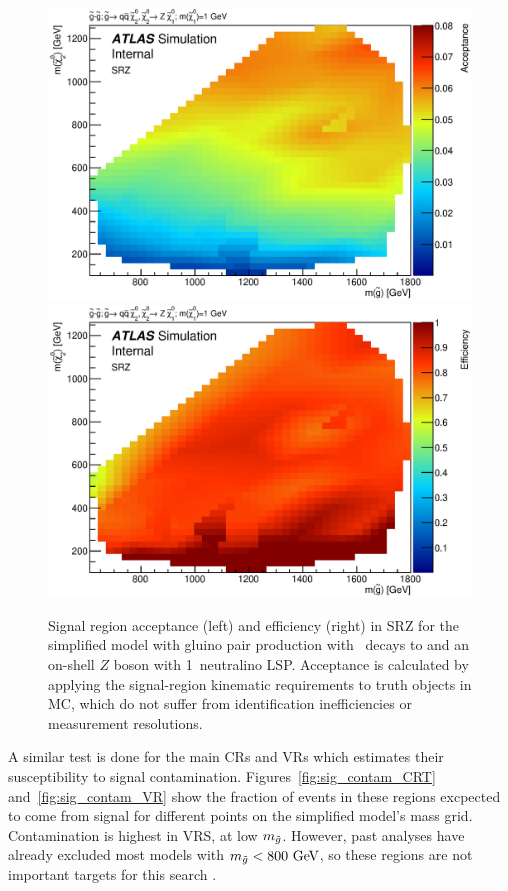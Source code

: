 \begin{figure}[ht]
\centering
\includegraphics[width=.48\textwidth]{figures/signalacceptcontam/acc_SM_GG_N2_1.eps}
\includegraphics[width=.48\textwidth]{figures/signalacceptcontam/eff_SM_GG_N2_1.eps}
\caption{
Signal region acceptance (left) and efficiency (right) in SRZ for the simplified model with gluino pair production with \chitwozero\ decays to \chionezero and an on-shell $Z$ boson with 1\gev~neutralino LSP.  
Acceptance is calculated by applying the signal-region kinematic requirements to truth objects in \ac{MC}, which do not suffer from identification inefficiencies or measurement resolutions.
}
\label{fig:acc_SMGGN2_1_z}
\end{figure}

A similar test is done for the main \acp{CR} and \acp{VR} which estimates their susceptibility to signal contamination. Figures~\ref{fig:sig_contam_CRT} and~\ref{fig:sig_contam_VR} show the fraction of events in these regions excpected to come from signal for different points on the simplified model's mass grid. Contamination is highest in VRS, at low $m_{\tilde g}$. However, past analyses have already excluded most models with $m_\go < 800 \gev$, so these regions are not important targets for this search \cite{SUSY-2014-10}.

